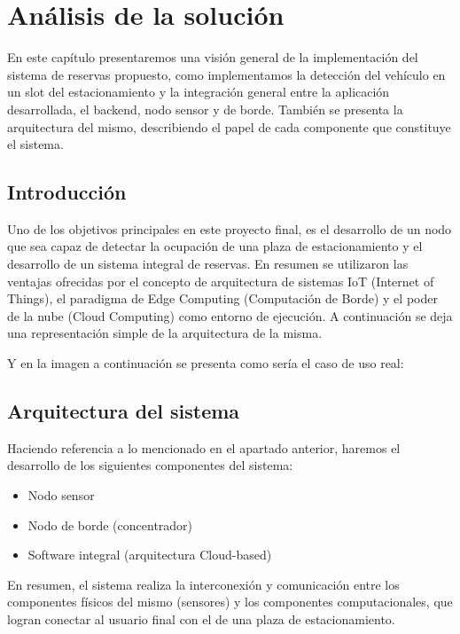 \newpage
\section{Análisis de la solución}
En este capítulo presentaremos una visión general de la implementación del sistema de reservas propuesto, como implementamos la detección del vehículo en un slot del estacionamiento y la integración general entre la aplicación desarrollada, el backend, nodo sensor y de borde. También se presenta la arquitectura del mismo, describiendo el papel de cada componente que constituye el sistema.


\subsection{Introducción}
Uno de los objetivos principales en este proyecto final, es el desarrollo de un nodo que sea capaz de detectar la ocupación de una plaza de estacionamiento y el desarrollo de un sistema integral de reservas. En resumen se utilizaron las ventajas ofrecidas por el concepto de arquitectura de sistemas IoT (Internet of Things), el paradigma de Edge Computing (Computación de Borde) y el poder de la nube (Cloud Computing) como entorno de ejecución. A continuación se deja una representación simple de la arquitectura de la misma.


Y en la imagen a continuación se presenta como sería el caso de uso real:

\subsection{Arquitectura del sistema}
Haciendo referencia a lo mencionado en el apartado anterior, haremos el desarrollo de los siguientes componentes del sistema:

\begin{itemize}
    \item Nodo sensor
    \item Nodo de borde (concentrador)
    \item Software integral (arquitectura Cloud-based)
\end{itemize}

En resumen, el sistema realiza la interconexión y comunicación entre los componentes físicos del mismo (sensores) y los componentes computacionales, que logran conectar al usuario final con el de una plaza de estacionamiento.





